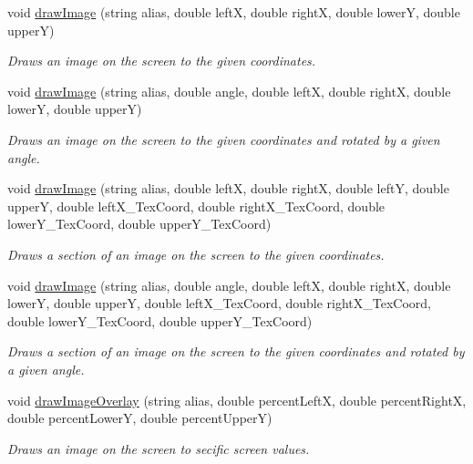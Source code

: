 \begin{CompactItemize}
void \hyperlink{class_resource_mgr_95a5d22ee4e147ea77268a5e2aab8659}{drawImage} (string alias, double leftX, double rightX, double lowerY, double upperY)
\begin{CompactList}\small\item\em Draws an image on the screen to the given coordinates. \item\end{CompactList}\item 
void \hyperlink{class_resource_mgr_69cd8853048f2a2b3828e3a10b34812e}{drawImage} (string alias, double angle, double leftX, double rightX, double lowerY, double upperY)
\begin{CompactList}\small\item\em Draws an image on the screen to the given coordinates and rotated by a given angle. \item\end{CompactList}\item 
void \hyperlink{class_resource_mgr_1af447bb573344a7b20e3b5f6ffd1fe2}{drawImage} (string alias, double leftX, double rightX, double leftY, double upperY, double leftX\_\-TexCoord, double rightX\_\-TexCoord, double lowerY\_\-TexCoord, double upperY\_\-TexCoord)
\begin{CompactList}\small\item\em Draws a section of an image on the screen to the given coordinates. \item\end{CompactList}\item 
void \hyperlink{class_resource_mgr_4a7ff6c298fec087d6080bbb46bea663}{drawImage} (string alias, double angle, double leftX, double rightX, double lowerY, double upperY, double leftX\_\-TexCoord, double rightX\_\-TexCoord, double lowerY\_\-TexCoord, double upperY\_\-TexCoord)
\begin{CompactList}\small\item\em Draws a section of an image on the screen to the given coordinates and rotated by a given angle. \item\end{CompactList}\item 
void \hyperlink{class_resource_mgr_69697bb29673dc8ef6a582901d456807}{drawImageOverlay} (string alias, double percentLeftX, double percentRightX, double percentLowerY, double percentUpperY)
\begin{CompactList}\small\item\em Draws an image on the screen to secific screen values. \item\end{CompactList}\item 

\end{CompactItemize}
